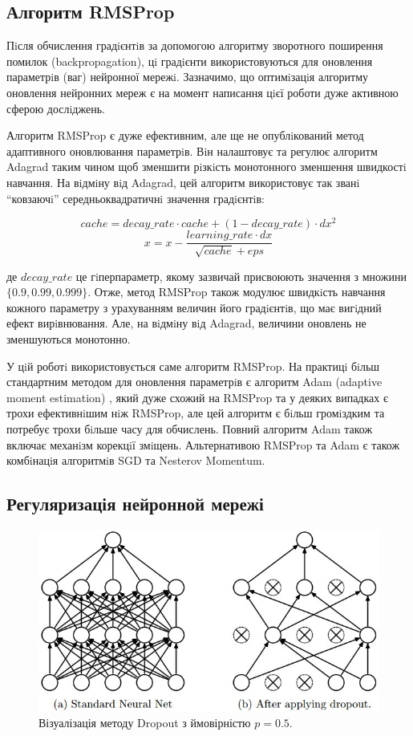 \subsection{Алгоритм RMSProp}

Пiсля обчислення градiєнтiв за допомогою алгоритму зворотного поширення помилок (backpropagation), цi градiєнти використовуються для оновлення параметрiв (ваг) нейронної мережi. Зазначимо, що оптимiзацiя алгоритму оновлення нейронних мереж є на момент написання цiєї роботи дуже активною сферою дослiджень.

Алгоритм RMSProp є дуже ефективним, але ще не опублiкований метод адаптивного оновлювання параметрiв. Вiн налаштовує та регулює алгоритм Adagrad \parencite{nn:adagrad} таким чином щоб зменшити рiзкiсть монотонного зменшення швидкостi навчання. На вiдмiну вiд Adagrad, цей алгоритм використовує так званi \enquote{ковзаючi} середньоквадратичнi значення градiєнтiв:

\begin{equation*}
cache = decay\_rate \cdot cache + (1 - decay\_rate) \cdot dx^2
\end{equation*}
\begin{equation*}
x = x - \frac{learning\_rate \cdot dx}{\sqrt{cache} + eps}
\end{equation*}

де \(decay\_rate\) це гiперпараметр, якому зазвичай присвоюють значення з множини \(\{0.9, 0.99, 0.999\}\). Отже, метод RMSProp також модулює швидкiсть навчання кожного параметру з урахуванням величин його градiєнтiв, що має вигiдний ефект вирiвнювання. Але, на вiдмiну вiд Adagrad, величини оновлень не зменшуються монотонно.

У цiй роботi використовується саме алгоритм RMSProp. На практицi бiльш стандартним методом для оновлення параметрiв є алгоритм Adam (adaptive moment estimation) \parencite{nn:adam}, який дуже схожий на RMSProp та у деяких випадках є трохи ефективнiшим нiж RMSProp, але цей алгоритм є бiльш громiздким та потребує трохи бiльше часу для обчислень. Повний алгоритм Adam також включає механiзм корекцiї змiщень. Альтернативою RMSProp та Adam є також комбiнацiя алгоритмiв SGD та Nesterov Momentum.

\subsection{Регуляризація нейронной мережі}

\begin{figure}[t]
	\centering	
	\includegraphics[width=0.6\linewidth]{Figures/Chapter4/dropout.jpeg}
	\endminipage\hfill
	
	\caption{Візуалізація методу Dropout з ймовірністю \(p = 0.5\).}
	\label{fig:dropout}
\end{figure}

